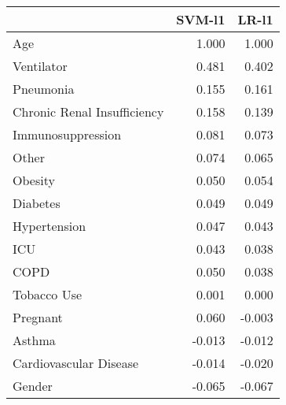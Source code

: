 \begin{tabular}{lrr}
\toprule
{} &  SVM-l1 &  LR-l1 \\
\midrule
Age                         &   1.000 &  1.000 \\
Ventilator                  &   0.481 &  0.402 \\
Pneumonia                   &   0.155 &  0.161 \\
Chronic Renal Insufficiency &   0.158 &  0.139 \\
Immunosuppression           &   0.081 &  0.073 \\
Other                       &   0.074 &  0.065 \\
Obesity                     &   0.050 &  0.054 \\
Diabetes                    &   0.049 &  0.049 \\
Hypertension                &   0.047 &  0.043 \\
ICU                         &   0.043 &  0.038 \\
COPD                        &   0.050 &  0.038 \\
Tobacco Use                 &   0.001 &  0.000 \\
Pregnant                    &   0.060 & -0.003 \\
Asthma                      &  -0.013 & -0.012 \\
Cardiovascular Disease      &  -0.014 & -0.020 \\
Gender                      &  -0.065 & -0.067 \\
\bottomrule
\end{tabular}
